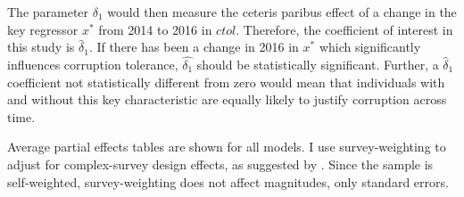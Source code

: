 \documentclass[12pt,a4]{article}
\begin{document}
The parameter $\delta_1$ would then measure the ceteris paribus effect of a change in the key regressor $x^*$ from 2014 to 2016 in $ctol$. Therefore, the coefficient of interest in this study is $\widehat{\delta}_1$. If there has been a change in 2016 in $x^*$ which significantly influences corruption tolerance, $\widehat{\delta_1}$ should be statistically significant. Further, a $\widehat{\delta}_1$ coefficient not statistically different from zero would mean that individuals with and without this key characteristic are equally likely to justify corruption across time. 

Average partial effects tables are shown for all models. I use survey-weighting to adjust for complex-survey design effects, as suggested by \textcite{Castorena.2021}. Since the sample is self-weighted, survey-weighting does not affect magnitudes, only standard errors.
\end{document}

